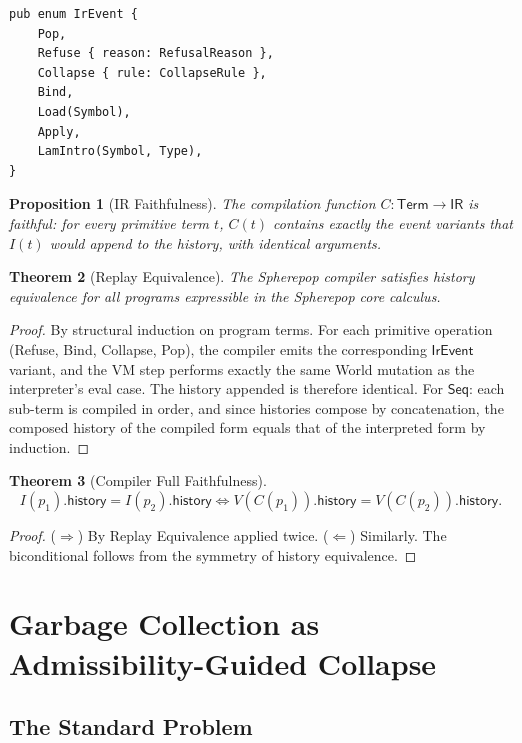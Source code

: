 \documentclass[12pt, a4paper, openany]{book}
\theoremstyle{plain}
\newtheorem{theorem}{Theorem}[chapter]
\newtheorem{proposition}[theorem]{Proposition}
\theoremstyle{definition}
\theoremstyle{remark}
\begin{document}
\begin{lstlisting}[style=rust, caption={Event IR in Rust}]
pub enum IrEvent {
    Pop,
    Refuse { reason: RefusalReason },
    Collapse { rule: CollapseRule },
    Bind,
    Load(Symbol),
    Apply,
    LamIntro(Symbol, Type),
}
\end{lstlisting}

\begin{proposition}[IR Faithfulness]
The compilation function $C : \mathsf{Term} \to \mathsf{IR}$ is faithful: for
every primitive term $t$, $C(t)$ contains exactly the event variants that $I(t)$
would append to the history, with identical arguments.
\end{proposition}

\begin{theorem}[Replay Equivalence]
The Spherepop compiler satisfies history equivalence for all programs expressible
in the Spherepop core calculus.
\end{theorem}

\begin{proof}
By structural induction on program terms. For each primitive operation (Refuse,
Bind, Collapse, Pop), the compiler emits the corresponding $\mathsf{IrEvent}$
variant, and the VM step performs exactly the same World mutation as the
interpreter's eval case. The history appended is therefore identical. For $\mathsf{Seq}$:
each sub-term is compiled in order, and since histories compose by concatenation,
the composed history of the compiled form equals that of the interpreted form by
induction.
\end{proof}

\begin{theorem}[Compiler Full Faithfulness]
\[
I(p_1).\mathsf{history} = I(p_2).\mathsf{history}
\iff
V(C(p_1)).\mathsf{history} = V(C(p_2)).\mathsf{history}.
\]
\end{theorem}

\begin{proof}
($\Rightarrow$) By Replay Equivalence applied twice. ($\Leftarrow$) Similarly.
The biconditional follows from the symmetry of history equivalence.
\end{proof}

\chapter{Garbage Collection as Admissibility-Guided Collapse}

\section{The Standard Problem}
\end{document}
